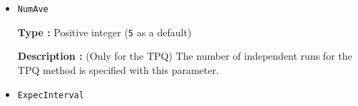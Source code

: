 \begin{itemize}
{\bf Description :} (Only for TPQ) 
We use $l$ as $l-\hat{H}/N_{s}$ in the TPQ calculation.
Usually, the largest eigenvalue of Hamiltonian is used as $l$. 
Thus, we take the default value of $l$
as a summation of the absolute values of each coefficients in the Hamiltonian
divided by the number of sites.


%
%
%
%
%
%
%

\item \verb|NumAve|

{\bf Type :} Positive integer (\verb|5| as a default)

{\bf Description :} (Only for the TPQ) The number of independent runs for the TPQ method is specified 
with this parameter.

\item \verb|ExpecInterval|


\end{itemize}
